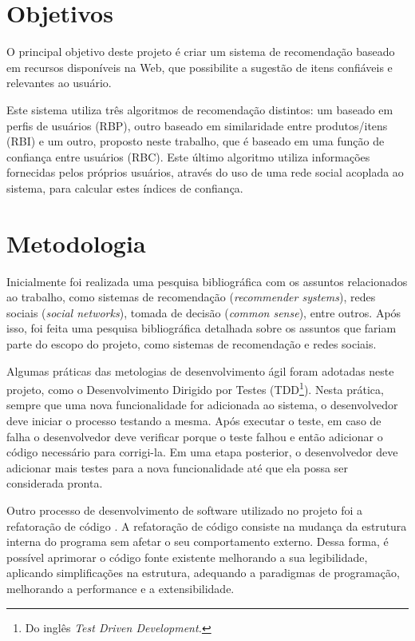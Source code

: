 

\section{Objetivos} %
\label{sec:objetivos}

 O principal objetivo deste projeto é criar um sistema de recomendação baseado em recursos disponíveis na Web, que possibilite a sugestão de itens confiáveis e relevantes ao usuário.

 Este sistema utiliza três algoritmos de recomendação distintos: um baseado em perfis de usuários (RBP), outro baseado em similaridade entre produtos/itens (RBI) e um outro, proposto neste trabalho, que é baseado em uma função de confiança entre usuários (RBC). Este último algoritmo utiliza informações fornecidas pelos próprios usuários, através do uso de uma rede social acoplada ao sistema, para calcular estes índices de confiança.


\section{Metodologia} %
\label{sec:metodologia}

 Inicialmente foi realizada uma pesquisa bibliográfica com os assuntos relacionados ao trabalho, como sistemas de recomendação (\textit{recommender systems}), redes sociais (\textit{social networks}), tomada de decisão (\textit{common sense}), entre outros. Após isso, foi feita uma pesquisa bibliográfica detalhada sobre os assuntos que fariam parte do escopo do projeto, como sistemas de recomendação e redes sociais.

 Algumas práticas das metologias de desenvolvimento ágil foram adotadas neste projeto, como o Desenvolvimento Dirigido por Testes (TDD\footnote{Do inglês \textit{Test Driven Development.}}). Nesta prática, sempre que uma nova funcionalidade for adicionada ao sistema, o desenvolvedor deve iniciar o processo testando a mesma. Após executar o teste, em caso de falha o desenvolvedor deve verificar porque o teste falhou e então adicionar o código necessário para corrigi-la. Em uma etapa posterior, o desenvolvedor deve adicionar mais testes para a nova funcionalidade até que ela possa ser considerada pronta.
 
 Outro processo de desenvolvimento de software utilizado no projeto foi a refatoração de código \cite{fowler1999refactoring}. A refatoração de código consiste na mudança da estrutura interna do programa sem afetar o seu comportamento externo. Dessa forma, é possível aprimorar o código fonte existente melhorando a sua legibilidade, aplicando simplificações na estrutura, adequando a paradigmas de programação, melhorando a performance e a extensibilidade.
 
